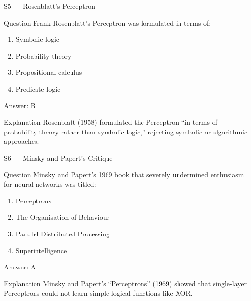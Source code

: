 \documentclass[aspectratio=169,8pt]{beamer}
\begin{document}
	\begin{frame}{S5 --- Rosenblatt's Perceptron}
		\begin{block}{Question}
			Frank Rosenblatt's Perceptron was formulated in terms of:
			\begin{enumerate}
				\item Symbolic logic
				\item Probability theory
				\item Propositional calculus
				\item Predicate logic
			\end{enumerate}
		\end{block}
		\begin{exampleblock}{Answer: B}\end{exampleblock}
		\begin{block}{Explanation}
			Rosenblatt (1958) formulated the Perceptron ``in terms of probability theory rather than symbolic logic,'' rejecting symbolic or algorithmic approaches.
		\end{block}
	\end{frame}
	
	\begin{frame}{S6 --- Minsky and Papert's Critique}
		\begin{block}{Question}
			Minsky and Papert's 1969 book that severely undermined enthusiasm for neural networks was titled:
			\begin{enumerate}
				\item Perceptrons
				\item The Organisation of Behaviour
				\item Parallel Distributed Processing
				\item Superintelligence
			\end{enumerate}
		\end{block}
		\begin{exampleblock}{Answer: A}\end{exampleblock}
		\begin{block}{Explanation}
			Minsky and Papert's ``Perceptrons'' (1969) showed that single-layer Perceptrons could not learn simple logical functions like XOR.
		\end{block}
	\end{frame}
	
\end{document}
